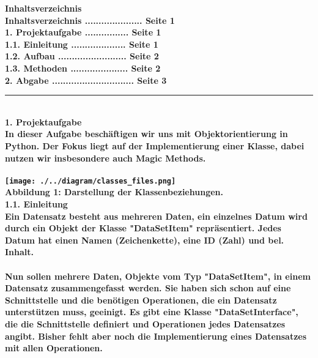 \documentclass[]{scrartcl}
\begin{document}
\bf \large Inhaltsverzeichnis \normalsize \normalfont\\[0.5cm]
\hspace*{0.5cm} Inhaltsverzeichnis ..................... Seite 1 \\[0.2cm]
\hspace*{0.5cm} \bf 1. Projektaufgabe \normalfont ................ Seite 1 \\
\hspace*{1cm}  1.1. Einleitung .................... Seite 1 \\
\hspace*{1cm}  1.2. Aufbau ......................... Seite 2 \\
\hspace*{1cm}  1.3. Methoden ..................... Seite 2 \\[0.2cm]
\hspace*{0.5cm} \bf 2. Abgabe \normalfont .............................. Seite 3 \\
\hrule\hfill\\[0.2cm]
\bf \large 1. Projektaufgabe \normalsize \normalfont\\[0.5cm]
In dieser Aufgabe beschäftigen wir uns mit Objektorientierung in Python.
Der Fokus liegt auf der Implementierung einer Klasse, dabei nutzen wir insbesondere auch Magic Methods.\\
\\
\hspace*{2cm}\texttt{[image: ./../diagram/classes\_files.png]}\\
\hspace*{3cm}\scriptsize\bf Abbildung 1: \normalfont Darstellung der Klassenbeziehungen.\normalsize\\
\bf 1.1. Einleitung \normalfont\\[0.5cm]
Ein Datensatz besteht aus mehreren Daten, ein einzelnes Datum wird durch ein Objekt der Klasse "DataSetItem" repräsentiert.
Jedes Datum hat einen Namen (Zeichenkette), eine ID (Zahl) und bel. Inhalt.\\
\\
Nun sollen mehrere Daten, Objekte vom Typ "DataSetItem", in einem Datensatz zusammengefasst werden.
Sie haben sich schon auf eine Schnittstelle und die benötigen Operationen, die ein Datensatz unterstützen muss, geeinigt.
Es gibt eine Klasse "DataSetInterface", die die Schnittstelle definiert und Operationen jedes Datensatzes angibt.
Bisher fehlt aber noch die Implementierung eines Datensatzes mit allen Operationen.\\
\end{document}
